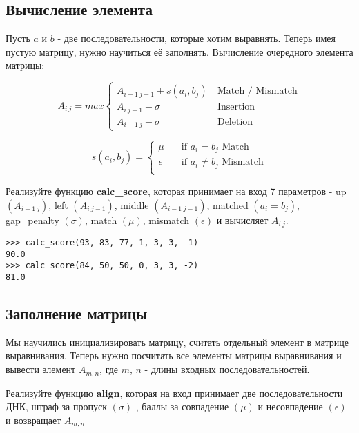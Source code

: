 \documentclass{article}
\begin{document}
\subsection*{Вычисление элемента}

Пусть $a$ и $b$ - две последовательности, которые хотим выравнять. Теперь имея пустую матрицу, нужно научиться её заполнять. Вычисление очередного элемента матрицы:

\begin{equation*}
A_{i \ j} = max \begin{cases} A_{i-1 \ j-1} + s(a_{i},b_{j}) & \ \text{Match / Mismatch}\\ A_{i \ j-1} - \sigma & \ \text{Insertion} \\ A_{i-1\ j} - \sigma & \ \text{Deletion} \end{cases}
\end{equation*}

\begin{equation*}
s(a_{i},b_{j}) = \begin{cases} \mu & \quad \text{if } a_{i} = b_{j} \text{ Match}\\ \epsilon & \quad \text{if } a_{i} \ne b_{j} \text{ Mismatch}\\ \end{cases}
\end{equation*}

Реализуйте функцию \textbf{calc\_score}, которая принимает на вход 7 параметров - up $(A_{i - 1 \ j})$,
left $(A_{i \ j - 1})$,
middle $(A_{i - 1 \ j - 1})$,
matched $(a_{i} = b_{j})$,
gap\_penalty $(\sigma)$,
match $(\mu)$,
mismatch $(\epsilon)$ и вычисляет $A_{i \ j}$.


\begin{verbatim}
>>> calc_score(93, 83, 77, 1, 3, 3, -1)
90.0
>>> calc_score(84, 50, 50, 0, 3, 3, -2)
81.0
\end{verbatim}

\subsection*{Заполнение матрицы}
Мы научились инициализировать матрицу, считать отдельный элемент в матрице выравнивания. Теперь нужно посчитать все элементы матрицы выравнивания и вывести элемент $A_{m, n}$, где $m$, $n$ - длины входных последовательностей.

Реализуйте функцию \textbf{align},  которая на вход принимает две последовательности ДНК, штраф за пропуск $(\sigma)$ , баллы за совпадение $(\mu)$ и несовпадение $(\epsilon)$ и возвращает $A_{m,n}$
\end{document}
